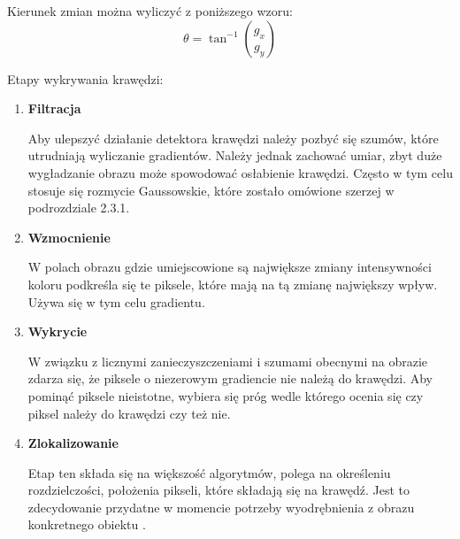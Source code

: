 \documentclass[eng,oneside]{mgr}
\begin{document}
\par Kierunek zmian można wyliczyć z poniższego wzoru:
\begin{equation}
\theta = \tan^{-1} \binom{g_x}{g_y}
\end{equation}
\par Etapy wykrywania krawędzi:
\begin{enumerate}
\item \textbf{Filtracja}
\par Aby ulepszyć działanie detektora krawędzi należy pozbyć się szumów, które utrudniają wyliczanie gradientów. Należy jednak zachować umiar, zbyt duże wygładzanie obrazu może spowodować osłabienie krawędzi. Często w tym celu stosuje się rozmycie Gaussowskie, które zostało omówione szerzej w podrozdziale 2.3.1.
\item \textbf{Wzmocnienie}
\par W polach obrazu gdzie umiejscowione są największe zmiany intensywności koloru podkreśla się te piksele, które mają na tą zmianę największy wpływ. Używa się w tym celu gradientu.
\item \textbf{Wykrycie}
\par W związku z licznymi zanieczyszczeniami i szumami obecnymi na obrazie zdarza się, że piksele o niezerowym gradiencie nie należą do krawędzi. Aby pominąć piksele nieistotne, wybiera się próg wedle którego ocenia się czy piksel należy do krawędzi czy też nie.
\item \textbf{Zlokalizowanie}
\par Etap ten składa się na większość algorytmów, polega na określeniu rozdzielczości, położenia pikseli, które składają się na krawędź. Jest to zdecydowanie przydatne w momencie potrzeby wyodrębnienia z obrazu konkretnego obiektu \cite{etapy}.

\end{enumerate}
\end{document}
